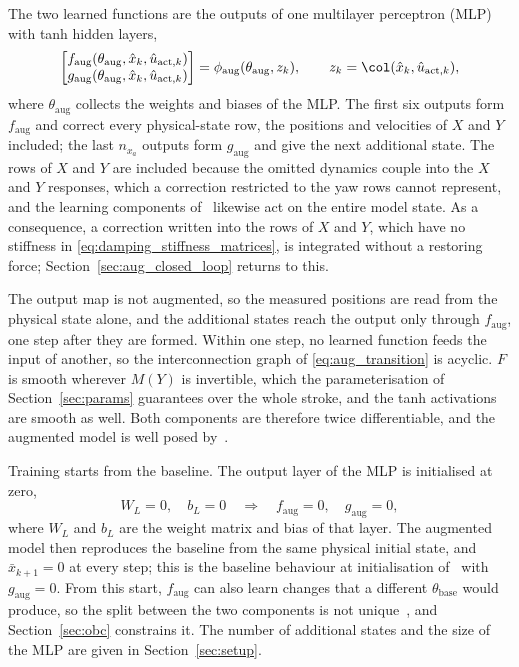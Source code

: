 The two learned functions are the outputs of one multilayer perceptron (MLP)
with tanh hidden layers,
\begin{equation}
 \begin{bmatrix}
  f_{\mathrm{aug}}(\theta_{\mathrm{aug}},\hat x_k,\hat u_{\mathrm{act},k})\\
  g_{\mathrm{aug}}(\theta_{\mathrm{aug}},\hat x_k,\hat u_{\mathrm{act},k})
 \end{bmatrix}
 =\phi_{\mathrm{aug}}(\theta_{\mathrm{aug}},z_k),\qquad
 z_k=\col(\hat x_k,\hat u_{\mathrm{act},k}),
 \label{eq:aug_mlp}
\end{equation}
where $\theta_{\mathrm{aug}}$ collects the weights and biases of the MLP.
The first six outputs form $f_{\mathrm{aug}}$ and correct every
physical-state row, the positions and velocities of $X$ and $Y$ included;
the last $n_{x_a}$ outputs form $g_{\mathrm{aug}}$ and give the next
additional state.
The rows of $X$ and $Y$ are included because the omitted dynamics couple
into the $X$ and $Y$ responses, which a correction restricted to the yaw rows
cannot represent, and the learning components
of~\cite[Sec.~2]{hoekstra2025lfr} likewise act on the entire model state.
As a consequence, a correction written into the rows of $X$ and $Y$, which
have no stiffness in \eqref{eq:damping_stiffness_matrices}, is integrated
without a restoring force; Section~\ref{sec:aug_closed_loop} returns to
this.

The output map is not augmented, so the measured positions are read from the
physical state alone, and the additional states reach the output only
through $f_{\mathrm{aug}}$, one step after they are formed.
Within one step, no learned function feeds the input of another, so the
interconnection graph of \eqref{eq:aug_transition} is acyclic.
$F$ is smooth wherever $M(Y)$ is invertible, which the parameterisation of
Section~\ref{sec:params} guarantees over the whole stroke, and the tanh
activations are smooth as well.
Both components are therefore twice differentiable, and the augmented model
is well posed by~\cite[Thm.~9]{hoekstra2026lfr}.

Training starts from the baseline.
The output layer of the MLP is initialised at zero,
\begin{equation}
 W_L=0,\quad b_L=0
 \quad\Longrightarrow\quad
 f_{\mathrm{aug}}=0,\quad g_{\mathrm{aug}}=0 ,
 \label{eq:aug_zero_init}
\end{equation}
where $W_L$ and $b_L$ are the weight matrix and bias of that layer.
The augmented model then reproduces the baseline from the same physical
initial state, and $\bar x_{k+1}=0$ at every step; this is the baseline
behaviour at initialisation of~\cite[Eq.~(29)]{hoekstra2026lfr} with
$g_{\mathrm{aug}}=0$.
From this start, $f_{\mathrm{aug}}$ can also learn changes that a different
$\theta_{\mathrm{base}}$ would produce, so the split between the two
components is not unique~\cite[Sec.~5.2]{hoekstra2026lfr}, and
Section~\ref{sec:obc} constrains it.
The number of additional states and the size of the MLP are given in
Section~\ref{sec:setup}.

